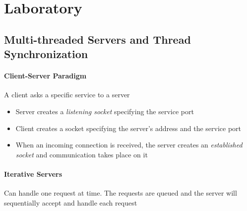 \section{Laboratory}

\subsection{Multi-threaded Servers and Thread Synchronization}
\paragraph{Client-Server Paradigm}
A client asks a specific service to a server
\begin{itemize}
    \item Server creates a \textit{listening socket} specifying the service port
    \item Client creates a socket specifying the server's address and the service port
    \item When an incoming connection is received, the server creates an \textit{established socket} and communication takes place on it
\end{itemize}
\paragraph{Iterative Servers}
Can handle one request at time. The requests are queued and the server will sequentially accept and handle each request

